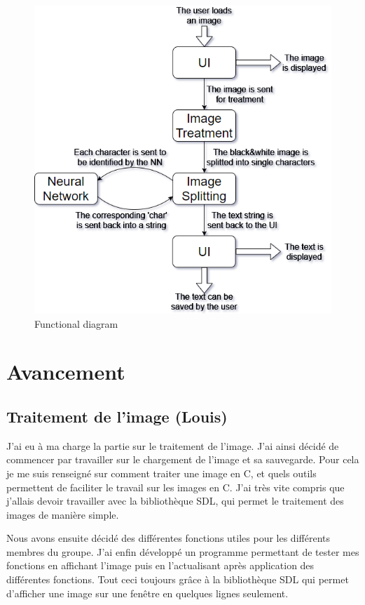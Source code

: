 \documentclass[12pt]{report}
\begin{document}
\begin{figure}[H]
    \centering
    \includegraphics[width=1\textwidth]{OCR_functionnal_diagram}
    \caption{Functional diagram}
\end{figure}

\chapter{Avancement}

\section{Traitement de l'image (Louis)}

J’ai eu à ma charge la partie sur le traitement de l’image. J’ai ainsi décidé de commencer par travailler sur le chargement de l’image et sa sauvegarde. Pour cela je me suis renseigné sur comment traiter une image en C, et quels outils permettent de faciliter le travail sur les images en C. J’ai très vite compris que j’allais devoir travailler avec la bibliothèque SDL, qui permet le traitement des images de manière simple.
 
Nous avons ensuite décidé des différentes fonctions utiles pour les différents membres du groupe.
J’ai enfin développé un programme permettant de tester mes fonctions en affichant l’image puis en l’actualisant après application des différentes fonctions. Tout ceci toujours grâce à la bibliothèque SDL qui permet d’afficher une image sur une fenêtre en quelques lignes seulement.
\end{document}
